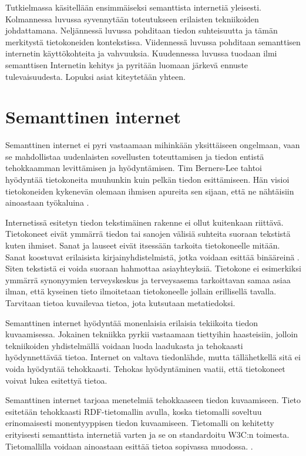 \documentclass[finnish, 12pt, a4paper, elec, utf8, pdfa, online]{aaltothesis}
\begin{document}
Tutkielmassa käsitellään ensimmäiseksi semanttista internetiä yleisesti. Kolmannessa luvussa syvennytään toteutukseen erilaisten tekniikoiden johdattamana. Neljännessä luvussa pohditaan tiedon suhteisuutta ja tämän merkitystä tietokoneiden kontekstissa. Viidennessä luvussa pohditaan semanttisen internetin käyttökohteita ja vahvuuksia. Kuudennessa luvussa tuodaan ilmi semanttisen Internetin kehitys ja pyritään luomaan järkevä ennuste tulevaisuudesta. Lopuksi asiat kiteytetään yhteen.

\clearpage %
\section{Semanttinen internet}

Semanttinen internet ei pyri vastaamaan mihinkään yksittäiseen ongelmaan, vaan se mahdollistaa uudenlaisten sovellusten toteuttamisen ja tiedon entistä tehokkaamman levittämisen ja hyödyntämisen. Tim Berners-Lee tahtoi hyödyntää tietokoneita muuhunkin kuin pelkän tiedon esittämiseen. Hän visioi tietokoneiden kykenevän olemaan ihmisen apureita sen sijaan, että ne nähtäisiin ainoastaan työkaluina \cite{Berners_visio}.

Internetissä esitetyn tiedon tekstimäinen rakenne ei ollut kuitenkaan riittävä. Tietokoneet eivät ymmärrä tiedon tai sanojen välisiä suhteita suoraan tekstistä kuten ihmiset. Sanat ja lauseet eivät itsessään tarkoita tietokoneelle mitään. Sanat koostuvat erilaisista kirjainyhdistelmistä, jotka voidaan esittää binääreinä \cite{ASCII}. Siten tekstistä ei voida suoraan hahmottaa asiayhteyksiä. Tietokone ei esimerkiksi ymmärrä synonyymien terveyskeskus ja terveysasema tarkoittavan samaa asiaa ilman, että kyseinen tieto ilmoitetaan tietokoneelle jollain erillisellä tavalla. Tarvitaan tietoa kuvailevaa tietoa, jota kutsutaan metatiedoksi.

Semanttinen internet hyödyntää monenlaisia erilaisia tekiikoita tiedon kuvaamisessa. Jokainen tekniikka pyrkii vastaamaan tiettyihin haasteisiin, jolloin tekniikoiden yhdistelmällä voidaan luoda laadukasta ja tehokaasti hyödynnettävää tietoa. Internet on valtava tiedonlähde, mutta tällähetkellä sitä ei voida hyödyntää tehokkaasti. Tehokas hyödyntäminen vaatii, että tietokoneet voivat lukea esitettyä tietoa.

Semanttinen internet tarjoaa menetelmiä tehokkaaseen tiedon kuvaamiseen. Tieto esitetään tehokkaasti RDF-tietomallin avulla, koska tietomalli soveltuu erinomaisesti monentyyppisen tiedon kuvaamiseen. Tietomalli on kehitetty erityisesti semanttista internetiä varten ja se on standardoitu W3C:n toimesta. Tietomallilla voidaan ainoastaan esittää tietoa sopivassa muodossa. \cite{RDF_XML}.
\end{document}

